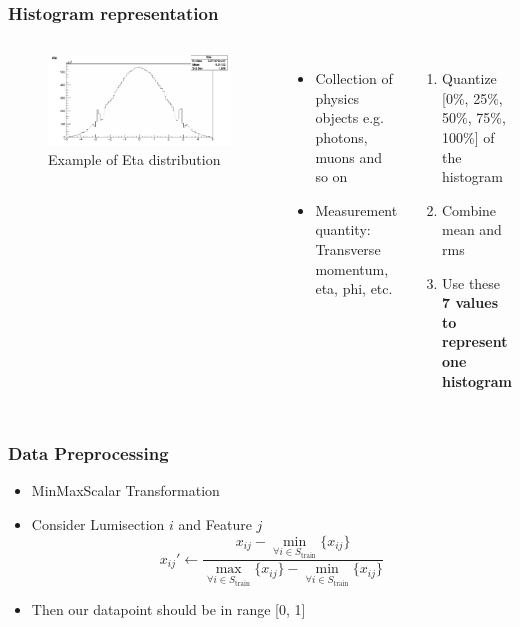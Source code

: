 \documentclass{beamer}
\begin{document}
\begin{frame}
\frametitle{Histogram representation}
\begin{columns}
    \begin{figure}
        \includegraphics[height=0.4\textheight, width=1.0\textwidth]{images/ex_eta_dist}
        \caption{Example of Eta distribution}
    \end{figure}
    \begin{itemize}
    \item Collection of physics objects e.g. photons, muons and so on
    \item Measurement quantity: Transverse momentum, eta, phi, etc.
    \href{https://github.com/calzonelover/CMS_DC_ANOMALY/blob/master/data/prompt_reco/setting.py}{}
    \end{itemize}
    \begin{enumerate}
        \item Quantize [0$\%$, 25$\%$, 50$\%$, 75$\%$, 100$\%$] of the histogram
        \item Combine mean and rms
        \item Use these \textbf{7 values to represent one histogram}
    \end{enumerate}
\end{columns}
\end{frame}
    
\begin{frame}
\frametitle{Data Preprocessing}
\begin{itemize}
    \item MinMaxScalar Transformation
    \item Consider Lumisection $i$ and Feature $j$
    \begin{equation}
        x_{ij}' \leftarrow \frac{x_{ij} - \min_{\forall i\in S_{\text{train}}}\{x_{ij}\}}{\max_{\forall i\in S_{\text{train}}}\{x_{ij}\} - \min_{\forall i\in S_{\text{train}}}\{x_{ij}\} }
    \end{equation}
    \item Then our datapoint should be in range [0, 1]
\end{itemize}
\end{frame}
\end{document}
